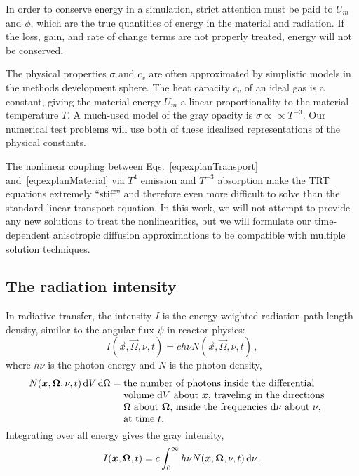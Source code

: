 In order to conserve energy in a simulation, strict attention must be paid to
$U_m$ and $\phi$, which are the true quantities of energy in
the material and radiation. If the loss, gain, and rate of change terms are not
properly treated, energy will not be conserved.

The physical properties $\sigma$ and $c_v$ are often approximated by simplistic
models in the methods development sphere. The heat capacity $c_v$ of an ideal
gas is a constant, giving the material energy $U_m$ a linear proportionality to
the material temperature $T$. A much-used model \cite{Mou2006,Wol2008} of the
gray opacity is $\sigma \propto \propto T^{-3}$.
Our numerical test problems will use both of these idealized representations of
the physical constants.

The nonlinear coupling between Eqs.~\eqref{eq:explanTransport}
and~\eqref{eq:explanMaterial} via $T^4$ emission and $T^{-3}$ absorption make
the TRT equations extremely ``stiff'' \cite{Kno2003} and therefore even more
difficult to solve than the standard linear transport equation. In this work,
we will not attempt to provide any new solutions to treat the nonlinearities,
but we will formulate our time-dependent anisotropic diffusion approximations to
be compatible with multiple solution techniques.

\subsection{The radiation intensity}

In radiative transfer, the intensity $I$ is the energy-weighted radiation path
length density, similar to the angular flux $\psi$ in reactor physics:
\begin{equation*}
  I(\vec{x},\vec{\Omega},\nu, t) = c h\nu N(\vec{x},\vec{\Omega},\nu, t)\,,
\end{equation*}
where $h\nu$ is the photon energy and $N$ is the photon density,
\begin{align*}
  N(\vec{x},\vec{\Omega}, \nu, t) \ud V \ud \Omega
  &= \topbox{the number of photons inside the differential volume $\ud V$
  about $\vec{x}$, traveling in the directions $\Omega$ about
  $\vec{\Omega}$, inside the frequencies $\ud \nu$ about $\nu$, at time $t$.}
\end{align*}
Integrating over all energy gives the gray intensity,
\begin{equation*}
  I(\bm{x},\bm{\Omega}, t)
  = c \int_0^\infty h\nu N(\bm{x},\bm{\Omega},\nu, t) \mathop{}\!\mathrm{d}\nu \,.
\end{equation*}

